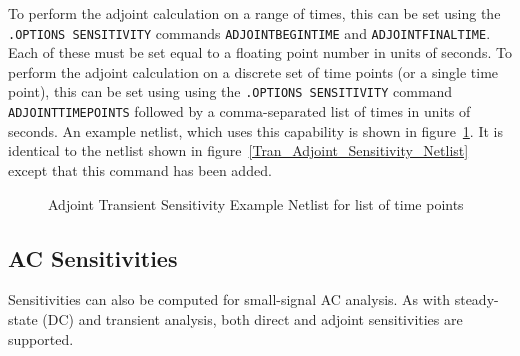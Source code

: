 To perform the adjoint calculation on a range of times, this can be set using 
the \texttt{.OPTIONS SENSITIVITY} commands \texttt{ADJOINTBEGINTIME} and 
\texttt{ADJOINTFINALTIME}.  Each of these must be set equal to a floating point
number in units of seconds.  To perform the adjoint calculation on a discrete 
set of time points (or a single time point), this can be set using using the 
\texttt{.OPTIONS SENSITIVITY} command \texttt{ADJOINTTIMEPOINTS} followed by a 
comma-separated list of times in units of seconds.  An example netlist, which 
uses this capability is shown in figure~\ref{Tran_Adjoint_Sensitivity_Netlist2}.  
It is identical to the netlist shown in figure~\ref{Tran_Adjoint_Sensitivity_Netlist} 
except that this command has been added.
\begin{figure}[htbp]
  \begin{centering}
\caption[Adjoint Transient Sensitivity Example Netlist for list of time points]
{Adjoint Transient Sensitivity Example Netlist for list of time points\label{Tran_Adjoint_Sensitivity_Netlist2} }
\end{centering}
\end{figure}

\clearpage
\subsection{AC Sensitivities}
Sensitivities can also be computed for small-signal AC analysis.  As
with steady-state (DC) and transient analysis, both direct and adjoint
sensitivities are supported.  


